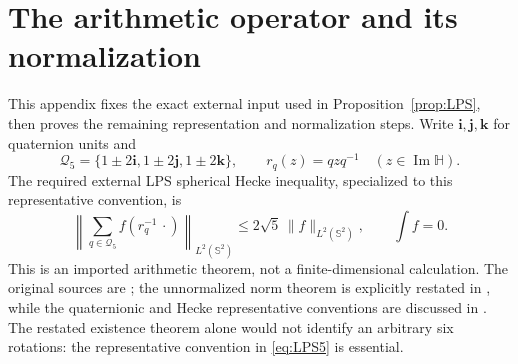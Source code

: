 \section{The arithmetic operator and its normalization}
\label{sec:normalization}
This appendix fixes the exact external input used in
Proposition~\ref{prop:LPS}, then proves the remaining representation
and normalization steps. Write $\mathbf i,\mathbf j,\mathbf k$ for
quaternion units and
\[
 \mathscr Q_5=\{1\pm2\mathbf i,1\pm2\mathbf j,1\pm2\mathbf k\},
 \qquad r_q(z)=qzq^{-1}\quad(z\in\operatorname{Im}\mathbb H).
\]
The required external LPS spherical Hecke inequality, specialized
to this representative convention, is
\begin{equation}\tag{LPS5}\label{eq:LPS5}
 \left\|\sum_{q\in\mathscr Q_5} f(r_q^{-1}\,\cdot)\right\|_{L^2(\mathbb S^2)}
             \le2\sqrt5\,\|f\|_{L^2(\mathbb S^2)},
           \qquad\int f=0.
\end{equation}
This is an imported arithmetic theorem, not a finite-dimensional
calculation. The original sources are \cite{LPS86,LPS87}; the
unnormalized norm theorem is explicitly restated in
\cite[Theorem 3(ii), p.\ 8 of the preprint]{Pisier}, while the
quaternionic and Hecke representative conventions are discussed in
\cite[Section 3.2]{PS}. The restated existence theorem alone would
not identify an arbitrary six rotations: the representative convention
in \eqref{eq:LPS5} is essential.

